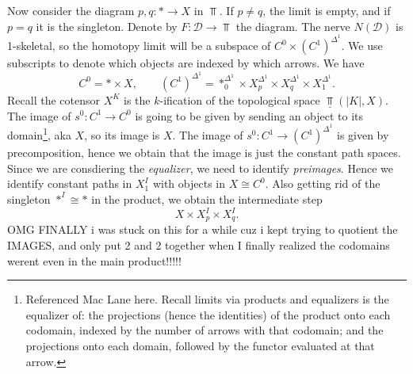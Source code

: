 Now consider the diagram $p,q : * \to X$ in $\Top $. If $p\neq q$, the limit is empty, and if $p=q$ it is the singleton. Denote by $F : \mathcal{D}  \to \Top $ the diagram. The nerve $N(\mathcal{D} )$ is 1-skeletal, so the homotopy limit will be a subspace of $C^0\times (C^1)^{\Delta^1} $. We use subscripts to denote which objects are indexed by which arrows. We have
\[
	C^0=*\times X,\qquad (C^1)^{\Delta^1} =*_0^{\Delta^1} \times X_p^{\Delta^1} \times X_q^{\Delta^1} \times X_1^{\Delta^1}
.\]
Recall the cotensor $X^K$ is the $k$-ification of the topological space $\underline{\Top } (\left| K \right| ,X)$. The image of $s^0 : C^1 \to C^0$ is going to be given by sending an object to its domain\footnote{Referenced Mac Lane here. Recall limits via products and equalizers is the equalizer of: the projections (hence the identities) of the product onto each codomain, indexed by the number of arrows with that codomain; and the projections onto each domain, followed by the functor evaluated at that arrow.}, aka $X$, so its image is $X$. The image of $s^0 : C^1 \to (C^1)^{\Delta^1} $ is given by precomposition, hence we obtain that the image is just the constant path spaces. Since we are consdiering the \emph{equalizer}, we need to identify \emph{preimages}. Hence we identify constant paths in $X_1^I$ with objects in $X\cong C^0$. Also getting rid of the singleton $*^I\cong *$ in the product, we obtain the intermediate step
\[
	X\times X_p^I \times X_q^I
.\]
OMG FINALLY i was stuck on this for a while cuz i kept trying to quotient the IMAGES, and only put 2 and 2 together when I finally realized the codomains werent even in the main product!!!!!

